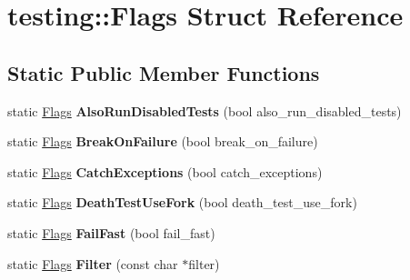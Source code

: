 \hypertarget{structtesting_1_1Flags}{}\section{testing\+:\+:Flags Struct Reference}
\label{structtesting_1_1Flags}
\subsection*{Static Public Member Functions}
\begin{DoxyCompactItemize}
\item 
\mbox{\label{structtesting_1_1Flags_a8bee2b5f94d8248b6791d6b005db146f}} 
static \mbox{\hyperlink{structtesting_1_1Flags}{Flags}} {\bfseries Also\+Run\+Disabled\+Tests} (bool also\+\_\+run\+\_\+disabled\+\_\+tests)
\item 
\mbox{\label{structtesting_1_1Flags_a62660e44922321f7640bc951a04c2296}} 
static \mbox{\hyperlink{structtesting_1_1Flags}{Flags}} {\bfseries Break\+On\+Failure} (bool break\+\_\+on\+\_\+failure)
\item 
\mbox{\label{structtesting_1_1Flags_a2c7d89f62f4328ae0ced66154ef96b44}} 
static \mbox{\hyperlink{structtesting_1_1Flags}{Flags}} {\bfseries Catch\+Exceptions} (bool catch\+\_\+exceptions)
\item 
\mbox{\label{structtesting_1_1Flags_a4468e5625833043596c44be174349d8c}} 
static \mbox{\hyperlink{structtesting_1_1Flags}{Flags}} {\bfseries Death\+Test\+Use\+Fork} (bool death\+\_\+test\+\_\+use\+\_\+fork)
\item 
\mbox{\label{structtesting_1_1Flags_a76fceab87a2bf1e45d5fa032083a9b13}} 
static \mbox{\hyperlink{structtesting_1_1Flags}{Flags}} {\bfseries Fail\+Fast} (bool fail\+\_\+fast)
\item 
\mbox{\label{structtesting_1_1Flags_afc7350b7c1ac4c0e0efe2d9a94729eb7}} 
static \mbox{\hyperlink{structtesting_1_1Flags}{Flags}} {\bfseries Filter} (const char $\ast$filter)
\item 
\mbox{\label{structtesting_1_1Flags_a825a5d763a31fe6c28f543990bd336df}} 

\end{DoxyCompactItemize}
